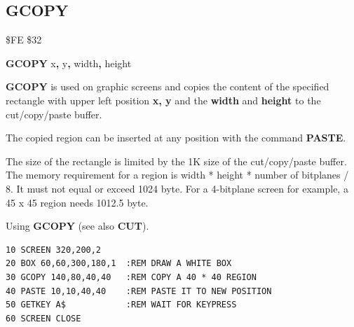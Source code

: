\newpage
\subsection{GCOPY}
\begin{description}[leftmargin=2cm,style=nextline]
\item [Token:] \$FE \$32
\item [Format:] {\bf GCOPY} x{\bf,} y{\bf,} width{\bf,} height
\item [Usage:] {\bf GCOPY} is used on graphic screens and copies the content
               of the specified rectangle
               with upper left position {\bf x, y} and the {\bf width}
               and {\bf height} to the cut/copy/paste buffer.

               The copied region can be inserted at any position with the
               command {\bf PASTE}.

\item [Remarks:] The size of the rectangle is limited by the 1K size of
                 the cut/copy/paste buffer. The memory requirement for
                 a region is width * height * number of bitplanes / 8.
                 It must not equal or exceed 1024 byte.
                 For a 4-bitplane screen for example, a 45 x 45 region
                 needs 1012.5 byte.

\item [Example:] Using {\bf GCOPY} (see also {\bf CUT}).
\begin{tcolorbox}[colback=black,coltext=white]
\verbatimfont{\codefont}
\begin{verbatim}
10 SCREEN 320,200,2
20 BOX 60,60,300,180,1  :REM DRAW A WHITE BOX
30 GCOPY 140,80,40,40   :REM COPY A 40 * 40 REGION
40 PASTE 10,10,40,40    :REM PASTE IT TO NEW POSITION
50 GETKEY A$            :REM WAIT FOR KEYPRESS
60 SCREEN CLOSE
\end{verbatim}
\end{tcolorbox}
\end{description}


\newpage
